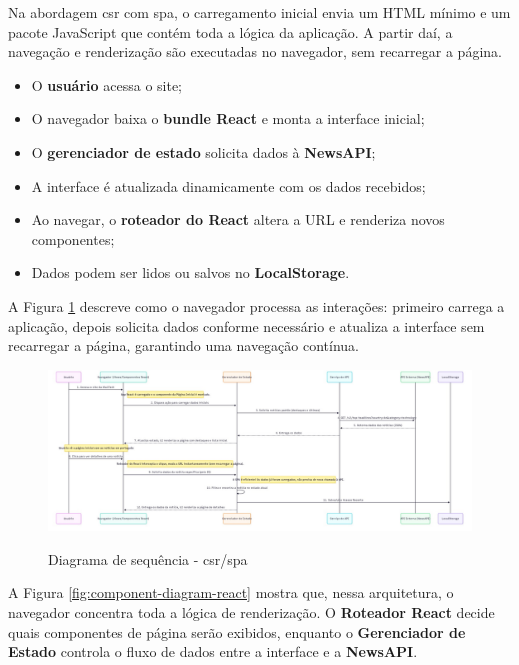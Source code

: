 Na abordagem \acrfull{csr} com \acrfull{spa}, o carregamento inicial envia um HTML mínimo e um pacote JavaScript que contém toda a lógica da aplicação. A partir daí, a navegação e renderização são executadas no navegador, sem recarregar a página.

\begin{itemize}
  \item O \textbf{usuário} acessa o site;
  \item O navegador baixa o \textbf{bundle React} e monta a interface inicial;
  \item O \textbf{gerenciador de estado} solicita dados à \textbf{NewsAPI};
  \item A interface é atualizada dinamicamente com os dados recebidos;
  \item Ao navegar, o \textbf{roteador do React} altera a URL e renderiza novos componentes;
  \item Dados podem ser lidos ou salvos no \textbf{LocalStorage}.
\end{itemize}

A Figura \ref{fig:sequence-diagram-csr} descreve como o navegador processa as interações: primeiro carrega a aplicação, depois solicita dados conforme necessário e atualiza a interface sem recarregar a página, garantindo uma navegação contínua.

\begin{figure}[H]
  \centering
  \caption{Diagrama de sequência - \acrshort{csr}/\acrshort{spa}}
  \includegraphics[width=1\textwidth]{media/wall_tech_detail_sequence_diagram.jpeg}
  \label{fig:sequence-diagram-csr}
\end{figure}


A Figura \ref{fig:component-diagram-react} mostra que, nessa arquitetura, o navegador concentra toda a lógica de renderização. O \textbf{Roteador React} decide quais componentes de página serão exibidos, enquanto o \textbf{Gerenciador de Estado} controla o fluxo de dados entre a interface e a \textbf{NewsAPI}.

